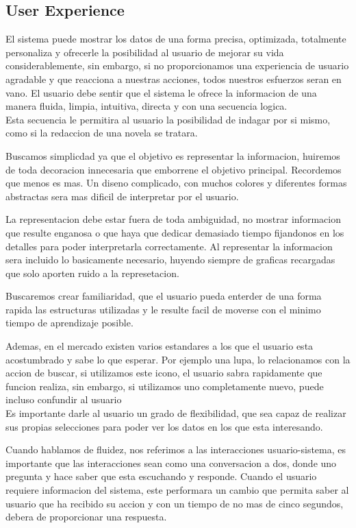 \subsection{User Experience}
 El sistema puede mostrar los datos de una forma precisa, optimizada, totalmente personaliza y ofrecerle
 la posibilidad al usuario de mejorar su vida considerablemente, sin embargo, si no proporcionamos una experiencia
 de usuario agradable y que reacciona a nuestras acciones, todos nuestros esfuerzos seran en vano.
 El usuario debe sentir que el sistema le ofrece la informacion de una manera fluida, limpia, intuitiva, directa y con
 una secuencia logica.\\
  
Esta secuencia le permitira al usuario la posibilidad de indagar por si mismo, como si la redaccion de una novela se tratara.

Buscamos simplicdad ya que el objetivo es representar la informacion, huiremos de toda decoracion innecesaria que emborrene
el objetivo principal. Recordemos que menos es mas. Un diseno complicado, con muchos colores y diferentes formas abstractas
sera mas dificil de interpretar por el usuario.

La representacion debe estar fuera de toda ambiguidad, no mostrar informacion que resulte enganosa o que haya que dedicar 
demasiado tiempo fijandonos en los detalles para poder interpretarla correctamente. Al representar la informacion sera 
incluido lo basicamente necesario, huyendo siempre de graficas recargadas que solo aporten ruido a la represetacion.

Buscaremos crear familiaridad, que el usuario pueda enterder de una forma rapida las estructuras utilizadas y 
le resulte facil de moverse con el minimo tiempo de aprendizaje posible. 

Ademas, en el mercado existen varios estandares a los que el usuario esta acostumbrado y sabe lo que esperar.
Por ejemplo una lupa, lo relacionamos con la accion de buscar, si utilizamos este icono, el usuario sabra rapidamente que
funcion realiza, sin embargo, si utilizamos uno completamente nuevo, puede incluso confundir al usuario\\

Es importante darle al usuario un grado de flexibilidad, que sea capaz de realizar sus propias selecciones para poder ver
los datos en los que esta interesando.

Cuando hablamos de fluidez, nos referimos a las interacciones usuario-sistema, es importante que las interacciones
sean como una conversacion a dos, donde uno pregunta y hace saber que esta escuchando y responde. Cuando el usuario 
requiere informacion del sistema, este performara un cambio que permita saber al usuario que ha recibido su accion y
con un tiempo de no mas de cinco segundos, debera de proporcionar una respuesta.

